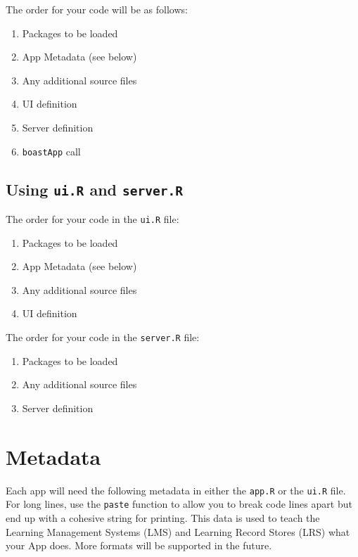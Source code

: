 \documentclass[]{book}
\providecommand{\tightlist}{%
  \setlength{\itemsep}{0pt}\setlength{\parskip}{0pt}}
\begin{document}
The order for your code will be as follows:

\begin{enumerate}
\def\labelenumi{\arabic{enumi}.}
\tightlist
\item
  Packages to be loaded
\item
  App Metadata (see below)
\item
  Any additional source files
\item
  UI definition
\item
  Server definition
\item
  \texttt{boastApp} call
\end{enumerate}

\hypertarget{using-ui.r-and-server.r}{%
\subsection{\texorpdfstring{Using \texttt{ui.R} and \texttt{server.R}}{Using ui.R and server.R}}\label{using-ui.r-and-server.r}}

The order for your code in the \texttt{ui.R} file:

\begin{enumerate}
\def\labelenumi{\arabic{enumi}.}
\tightlist
\item
  Packages to be loaded
\item
  App Metadata (see below)
\item
  Any additional source files
\item
  UI definition
\end{enumerate}

The order for your code in the \texttt{server.R} file:

\begin{enumerate}
\def\labelenumi{\arabic{enumi}.}
\tightlist
\item
  Packages to be loaded
\item
  Any additional source files
\item
  Server definition
\end{enumerate}

\hypertarget{metadata}{%
\section{Metadata}\label{metadata}}

Each app will need the following metadata in either the \texttt{app.R} or the \texttt{ui.R} file. For long lines, use the \texttt{paste} function to allow you to break code lines apart but end up with a cohesive string for printing. This data is used to teach the Learning Management Systems (LMS) and Learning Record Stores (LRS) what your App does. More formats will be supported in the future.
\end{document}
